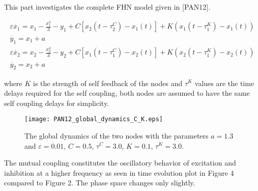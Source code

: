 \documentclass[12pt]{article}
\begin{document}
This part investigates the complete FHN model given in [PAN12].

\begin{subequations} \begin{align} \varepsilon  \dot{x_1} = x_1 - \frac{x_1^3}{3} -y_1  + C [x_2(t-\tau_2^C)-x_1(t)] + K(x_1(t-\tau_1^K) - x_1(t)) \label{eqn: frobenius 14}\\  \dot{y_1} = x_1+a \label{eqn: frobenius 15}  \\ \varepsilon  \dot{x_2} = x_2 - \frac{x_2^3}{3} -y_2  + C [x_1(t-\tau_1^C)-x_2(t)] + K(x_2(t-\tau_1^K) - x_2(t)) \label{eqn: frobenius 16}  \\  \dot{y_2} = x_2+a \label{eqn: frobenius 17} 
\end{align} 
\end{subequations}

where $K$ is the strength of self feedback of the nodes and $\tau^K$ values are the time delays required for the self coupling, both nodes are assumed to have the same self coupling delays for simplicity.

\begin{figure}[h!]
	\centering
	\texttt{[image: PAN12\_global\_dynamics\_C\_K.eps]}
		\caption{The global dynamics of the two nodes with the parameters $a=1.3$ and $\varepsilon = 0.01$, $C=0.5$, $\tau^C= 3.0$, $K=0.1$, $\tau^K= 3.0$.}
\end{figure}

The mutual coupling constitutes the oscillatory behavior of excitation and inhibition at a higher frequency as seen in time evolution plot in Figure 4 compared to Figure 2. The phase space changes only slightly.
\end{document}
